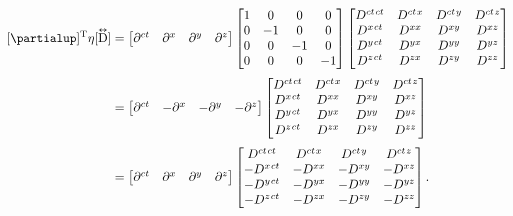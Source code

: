 \documentclass[12pt]{article}
\newcommand{\capdy}[1]{ \overset{ \text{\tiny$\bm\leftrightarrow$} }{\vphantom{\text{\small{A}}}\smash{#1}} }
\begin{document}
\begin{equation*}
\begin{aligned}
\mkern0mu [\partialup]^{\mathrm{T}} \eta [\capdy{\mathrm{D}}]
&=
\begin{bmatrix}
\partial^{ct} & \partial^x & \partial^y & \partial^z
\end{bmatrix}
\begin{bmatrix}
1 & 0 & 0 & 0 \\
0 & -1 & 0 & 0 \\
0 & 0 & -1 & 0 \\
0 & 0 & 0 & -1
\end{bmatrix}
\begin{bmatrix}
D^{ct \mkern1.5mu ct} & D^{ct \mkern1.5mu x} & D^{ct \mkern1.5mu y} & D^{ct \mkern1.5mu z} \\
D^{x \mkern1.5mu ct} & D^{x x} & D^{x y} & D^{x z}  \\
D^{y \mkern1.5mu ct} & D^{y x} & D^{y y} & D^{y z}  \\
D^{z \mkern1.5mu ct} & D^{z x} & D^{z y} & D^{z z} 
\end{bmatrix}
\\[3pt]
&=
\begin{bmatrix}
\partial^{ct} & - \partial^x & - \partial^y & -\partial^z
\end{bmatrix}
\begin{bmatrix}
D^{ct \mkern1.5mu ct} & D^{ct \mkern1.5mu x} & D^{ct \mkern1.5mu y} & D^{ct \mkern1.5mu z} \\
D^{x \mkern1.5mu ct} & D^{x x} & D^{x y} & D^{x z}  \\
D^{y \mkern1.5mu ct} & D^{y x} & D^{y y} & D^{y z}  \\
D^{z \mkern1.5mu ct} & D^{z x} & D^{z y} & D^{z z} 
\end{bmatrix}
\\[3pt]
&=
\begin{bmatrix}
\partial^{ct} & \partial^x & \partial^y & \partial^z
\end{bmatrix}
\begin{bmatrix}
D^{ct \mkern1.5mu ct} & D^{ct \mkern1.5mu x} & D^{ct \mkern1.5mu y} & D^{ct \mkern1.5mu z} \\
- D^{x \mkern1.5mu ct} & - D^{x x} & - D^{x y} & - D^{x z}  \\
- D^{y \mkern1.5mu ct} & - D^{y x} & - D^{y y} & - D^{y z}  \\
- D^{z \mkern1.5mu ct} & - D^{z x} & - D^{z y} & - D^{z z} 
\end{bmatrix}.
\end{aligned}
\end{equation*}
\end{document}
